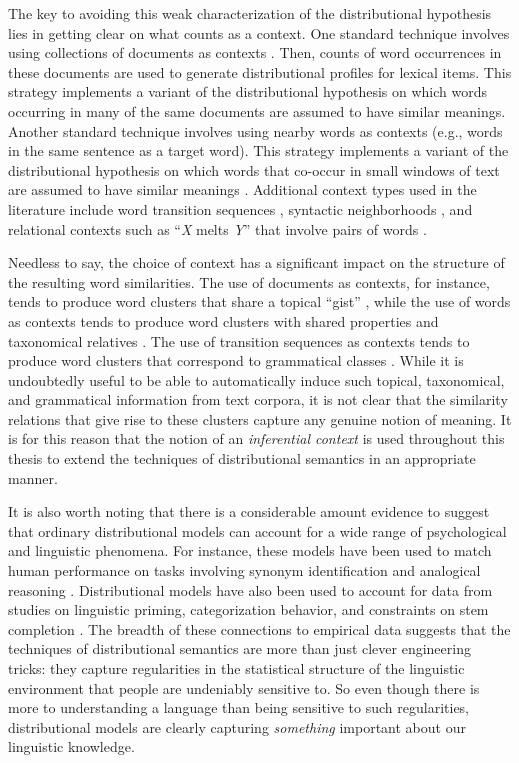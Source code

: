 The key to avoiding this weak characterization of the distributional hypothesis lies in getting clear on what counts as a context. One standard technique involves using collections of documents as contexts \citep[e.g.,][]{LandauerDumais:1997}. Then, counts of word occurrences in these documents are used to generate distributional profiles for lexical items. This strategy implements a variant of the distributional hypothesis on which words occurring in many of the same documents are assumed to have similar meanings. Another standard technique involves using nearby words as contexts (e.g., words in the same sentence as a target word). This strategy implements a variant of the distributional hypothesis on which words that co-occur in small windows of text are assumed to have similar meanings \citep[see e.g.,][]{JonesMewhort:2007,Sahlgren:2008,TurneyPantel:2010}. Additional context types used in the literature include word transition sequences \citep{JonesMewhort:2007}, syntactic neighborhoods \citep{Baroni:2014}, and relational contexts such as ``\textit{X} melts \textit{Y}'' that involve pairs of words \citep[see][p. 148-149]{TurneyPantel:2010}. 

Needless to say, the choice of context has a significant impact on the structure of the resulting word similarities. The use of documents as contexts, for instance, tends to produce word clusters that share a topical ``gist'' \citep{Baroni:2014}, while the use of words as contexts tends to produce word clusters with shared properties and taxonomical relatives \citep{TurneyPantel:2010}. The use of transition sequences as contexts tends to produce word clusters that correspond to grammatical classes \citep{JonesMewhort:2007}. While it is undoubtedly useful to be able to automatically induce such topical, taxonomical, and grammatical information from text corpora, it is not clear that the similarity relations that give rise to these clusters capture any genuine notion of meaning. It is for this reason that the notion of an \textit{inferential context} is used throughout this thesis to extend the techniques of distributional semantics in an appropriate manner.

It is also worth noting that there is a considerable amount evidence to suggest that ordinary distributional models can account for a wide range of psychological and linguistic phenomena. For instance, these models have been used to match human performance on tasks involving synonym identification \citep{LandauerDumais:1997} and analogical reasoning \citep{Plate:2003,Eliasmith:2001}. Distributional models have also been used to account for data from studies on linguistic priming, categorization behavior, and constraints on stem completion \citep{JonesMewhort:2007}. The breadth of these connections to empirical data suggests that the techniques of distributional semantics are more than just clever engineering tricks: they capture regularities in the statistical structure of the linguistic environment that people are undeniably sensitive to. So even though there is more to understanding a language than being sensitive to such regularities, distributional models are clearly capturing \textit{something} important about our linguistic knowledge.

